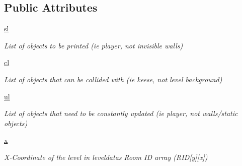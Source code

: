 \subsection*{Public Attributes}
\begin{DoxyCompactItemize}
\item 
\mbox{\label{classcollision_1_1levelmanager_1_1_level_manager_a05b0081f0ceb5ff238e29476d26f5bc5}} 
\hyperlink{classcollision_1_1levelmanager_1_1_level_manager_a05b0081f0ceb5ff238e29476d26f5bc5}{sl}
\begin{DoxyCompactList}\small\item\em List of objects to be printed (ie player, not invisible walls) \end{DoxyCompactList}\item 
\mbox{\label{classcollision_1_1levelmanager_1_1_level_manager_af2f247df791be0e0a8d1adc357e679b4}} 
\hyperlink{classcollision_1_1levelmanager_1_1_level_manager_af2f247df791be0e0a8d1adc357e679b4}{cl}
\begin{DoxyCompactList}\small\item\em List of objects that can be collided with (ie keese, not level background) \end{DoxyCompactList}\item 
\mbox{\label{classcollision_1_1levelmanager_1_1_level_manager_a612895753b85eced72f425f4f23885fd}} 
\hyperlink{classcollision_1_1levelmanager_1_1_level_manager_a612895753b85eced72f425f4f23885fd}{ul}
\begin{DoxyCompactList}\small\item\em List of objects that need to be constantly updated (ie player, not walls/static objects) \end{DoxyCompactList}\item 
\mbox{\label{classcollision_1_1levelmanager_1_1_level_manager_a5d1c987dbd37f1da1496915d4a754d70}} 
\hyperlink{classcollision_1_1levelmanager_1_1_level_manager_a5d1c987dbd37f1da1496915d4a754d70}{x}
\begin{DoxyCompactList}\small\item\em X-\/\+Coordinate of the level in leveldata\textquotesingle{}s Room ID array (R\+ID\mbox{[}y\mbox{]}\mbox{[}x\mbox{]}) \end{DoxyCompactList}\item 

\end{DoxyCompactItemize}
